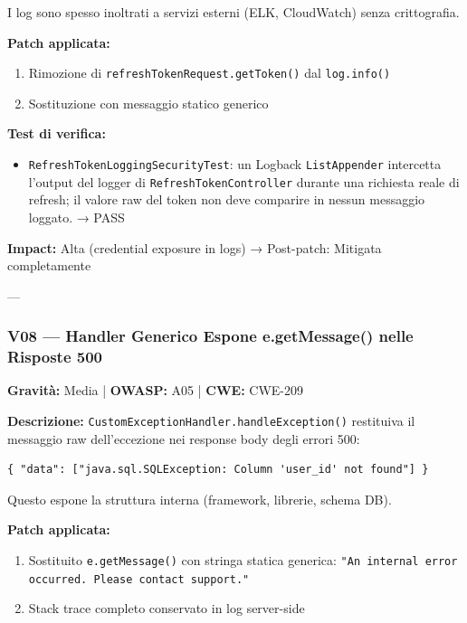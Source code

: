 \documentclass[12pt, a4paper]{article}
\begin{document}
    I log sono spesso inoltrati a servizi esterni (ELK, CloudWatch) senza crittografia.

    \textbf{Patch applicata:}
    \begin{enumerate}
        \item Rimozione di \texttt{refreshTokenRequest.getToken()} dal \texttt{log.info()}
        \item Sostituzione con messaggio statico generico
    \end{enumerate}

    \textbf{Test di verifica:}
    \begin{itemize}
        \item \texttt{RefreshTokenLoggingSecurityTest}: un Logback \texttt{ListAppender} intercetta
        l'output del logger di \texttt{RefreshTokenController} durante una richiesta reale di
        refresh; il valore raw del token non deve comparire in nessun messaggio loggato. → \checkmark{} PASS
    \end{itemize}

    \textbf{Impact:} Alta (credential exposure in logs) → Post-patch: Mitigata completamente

    ---

    \subsubsection{V08 — Handler Generico Espone e.getMessage() nelle Risposte 500}

    \textbf{Gravità:} Media | \textbf{OWASP:} A05 | \textbf{CWE:} CWE-209

    \textbf{Descrizione:} \texttt{CustomExceptionHandler.handleException()} restituiva il messaggio
    raw dell'eccezione nei response body degli errori 500:
    \begin{lstlisting}[language={}]
{ "data": ["java.sql.SQLException: Column 'user_id' not found"] }
    \end{lstlisting}

    Questo espone la struttura interna (framework, librerie, schema DB).

    \textbf{Patch applicata:}
    \begin{enumerate}
        \item Sostituito \texttt{e.getMessage()} con stringa statica generica:
        \texttt{"An internal error occurred. Please contact support."}
        \item Stack trace completo conservato in log server-side
    \end{enumerate}
\end{document}
